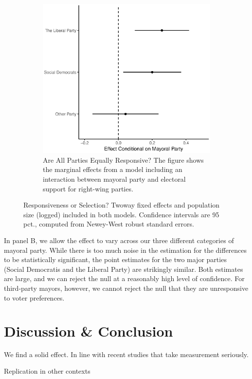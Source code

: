\documentclass[a4paper,12pt]{article}
\begin{document}
\begin{figure}
\begin{subfigure}{0.45\textwidth}
		\includegraphics[width=1\textwidth]{MargFX_31082018.eps}
		\caption{Are All Parties Equally Responsive? The figure shows the marginal effects from a model including an interaction between mayoral party and electoral support for right-wing parties.} \label{inter}
	\end{subfigure}
	\caption{Responsiveness or Selection? Twoway fixed effects and population size (logged) included in both models. Confidence intervals are 95 pct., computed from Newey-West robust standard errors.}
	\label{fig:mech}
\end{figure}

In panel B, we allow the effect to vary across our three different categories of mayoral party. While there is too much noise in the estimation for the differences to be statistically significant, the point estimates for the two major parties (Social Democratis and the Liberal Party) are strikingly similar. Both estimates are large, and we can reject the null at a reasonably high level of confidence. For third-party mayors, however, we cannot reject the null that they are unresponsive to voter preferences.


\section*{Discussion \& Conclusion}
We find a solid effect. In line with recent studies that take measurement seriously. 

Replication in other contexts

\onehalfspacing



\clearpage

\renewcommand{\thesubsection}{\Alph{subsection}}
\renewcommand{\thetable}{\Alph{subsection}\arabic{table}}
\renewcommand{\thefigure}{\Alph{subsection}\arabic{figure}}
\end{document}
